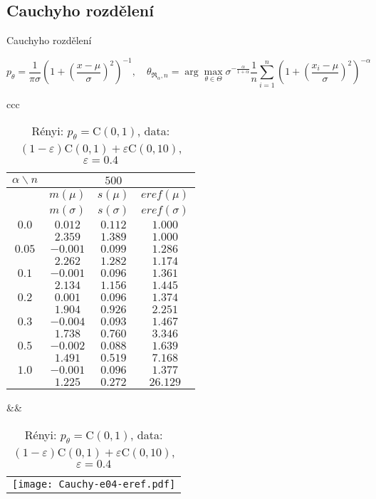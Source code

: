 \documentclass[11pt,a4paper]{beamer}
\newcommand{\amtiT}{\arg \max_{\theta \in \Theta}}
\begin{document}
\subsection{Cauchyho rozdělení}    %
\begin{frame}{Cauchyho rozdělení}

\parbox[t]{\linewidth}{\footnotesize	\[p_\theta = \frac{1}{\pi\sigma} \left( 1 + \left( \frac{x-\mu}{\sigma} \right)^2 \right)^{-1},\quad  \theta_{\mathfrak{R}_\alpha,n} = \amtiT \sigma^{-\frac{\alpha}{1+\alpha}} \frac{1}{n} \sum_{i=1}^n \left( 1 + \left( \frac{x_i-\mu}{\sigma} \right)^2 \right)^{-\alpha} \nonumber\]}

\begin{table}[htb] \tiny
\begin{center}
\begin{tabular}{ccc}
	\begin{tabular}{|c|ccc|}
	\hline
	$\alpha\backslash n$ && $500$ & \\
	\hline
	& $m(\mu)$ & $s(\mu)$ & $eref(\mu)$ \\
	& $m(\sigma)$ & $s(\sigma)$ & $eref(\sigma)$ \\
	\hline
	$0.0$ & $ 0.012 $ & $ 0.112 $ & $ 1.000 $\\
	 & $ 2.359 $ & $ 1.389 $ & $ 1.000 $\\
	\hline
	$0.05$ & $ -0.001 $ & $ 0.099 $ & $ 1.286 $\\
	 & $ 2.262 $ & $ 1.282 $ & $ 1.174 $\\
	\hline
	$0.1$ & $ -0.001 $ & $ 0.096 $ & $ 1.361 $\\
	 & $ 2.134 $ & $ 1.156 $ & $ 1.445 $\\
	\hline
	$0.2$ & $ 0.001 $ & $ 0.096 $ & $ 1.374 $\\
	 & $ 1.904 $ & $ 0.926 $ & $ 2.251 $\\
	\hline
	$0.3$ & $ -0.004 $ & $ 0.093 $ & $ 1.467 $\\
	 & $ 1.738 $ & $ 0.760 $ & $ 3.346 $\\
	\hline
	$0.5$ & $ -0.002 $ & $ 0.088 $ & $ 1.639 $\\
	 & $ 1.491 $ & $ 0.519 $ & $ 7.168 $\\
	\hline
	$1.0$ & $ -0.001 $ & $ 0.096 $ & $ 1.377 $\\
	 & $ 1.225 $ & $ 0.272 $ & $ 26.129 $\\
	\hline
	\end{tabular}
&&
	\begin{tabular}{c}
		\texttt{[image: Cauchy-e04-eref.pdf]}			
	\end{tabular}
\\
\end{tabular}
\end{center}
\caption{\footnotesize R\'{e}nyi: $p_\theta = \mathrm{C}(0,1)$, data: $(1-\varepsilon)\mathrm{C}(0,1) + \varepsilon \mathrm{C}(0,10)$, $\varepsilon =  0.4$}
\end{table}
\end{frame}
\end{document}
